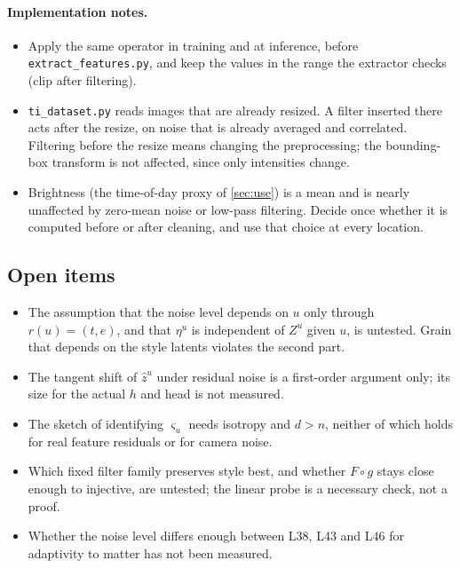 \paragraph{Implementation notes.}
\begin{itemize}[leftmargin=1.5em]
\item Apply the same operator in training and at inference, before \texttt{extract\_features.py}, and
      keep the values in the range the extractor checks (clip after filtering).
\item \texttt{ti\_dataset.py} reads images that are already resized. A filter inserted there acts after
      the resize, on noise that is already averaged and correlated. Filtering before the resize means
      changing the preprocessing; the bounding-box transform is not affected, since only intensities change.
\item Brightness (the time-of-day proxy of \cref{sec:use}) is a mean and is nearly unaffected by
      zero-mean noise or low-pass filtering. Decide once whether it is computed before or after
      cleaning, and use that choice at every location.
\end{itemize}

\subsection{Open items}
\label{app:noise:open}
\begin{itemize}[leftmargin=1.5em]
\item The assumption that the noise level depends on $u$ only through $r(u)=(t,e)$, and that $\eta^u$ is
      independent of $Z^u$ given $u$, is untested. Grain that depends on the style latents violates the
      second part.
\item The tangent shift of $\hat z^u$ under residual noise is a first-order argument only; its size for the
      actual $h$ and head is not measured.
\item The sketch of identifying $\varsigma_u$ needs isotropy and $d>n$, neither of which holds for real
      feature residuals or for camera noise.
\item Which fixed filter family preserves style best, and whether $F\circ g$ stays close enough to
      injective, are untested; the linear probe is a necessary check, not a proof.
\item Whether the noise level differs enough between L38, L43 and L46 for adaptivity to matter has not
      been measured.
\end{itemize}